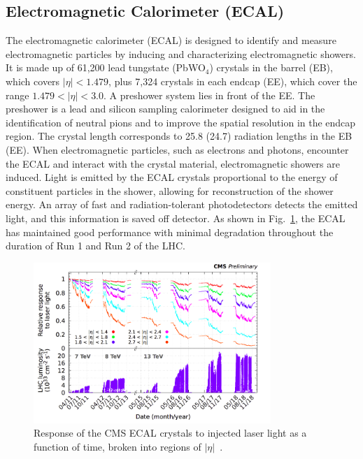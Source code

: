 \subsection{Electromagnetic Calorimeter (ECAL)}
The electromagnetic calorimeter (ECAL) is designed to identify and measure electromagnetic particles by inducing and characterizing electromagnetic showers. 
It is made up of 61,200 lead tungstate (PbWO$_4$) crystals in the barrel (EB), which covers $|\eta| < 1.479$, plus 7,324 crystals in each endcap (EE), which cover the range $1.479 < |\eta| < 3.0$. A preshower system lies in front of the EE. The preshower is a lead and silicon sampling calorimeter designed to aid in the identification of neutral pions and to improve the spatial resolution in the 
endcap region. 
The crystal length corresponds to 25.8 (24.7) radiation lengths in the EB (EE). When electromagnetic particles, such as 
electrons and photons, encounter the ECAL and interact with the crystal material, electromagnetic showers are induced. 
Light is emitted by the ECAL crystals proportional to the energy of constituent particles in the shower, allowing 
for reconstruction of the shower energy. An array of fast and radiation-tolerant photodetectors detects the emitted light, and this information is saved off detector. 
As shown in Fig.~\ref{fig:cms_ecal_response}, the ECAL has maintained good performance with minimal degradation throughout the duration of Run 1 and Run 2 of the LHC.

\begin{figure}[tb]
  \centering
   \includegraphics[width=0.8\textwidth]{fig/experiment/detector/cms_ecal_response.png}
	\caption[Response of the CMS ECAL crystals to injected laser light as a function of time, broken into regions of $|\eta|$.]
	{Response of the CMS ECAL crystals to injected laser light as a function of time, broken into regions of $|\eta|$~\cite{Cavallari:2798128}.}
	\label{fig:cms_ecal_response}
\end{figure}

